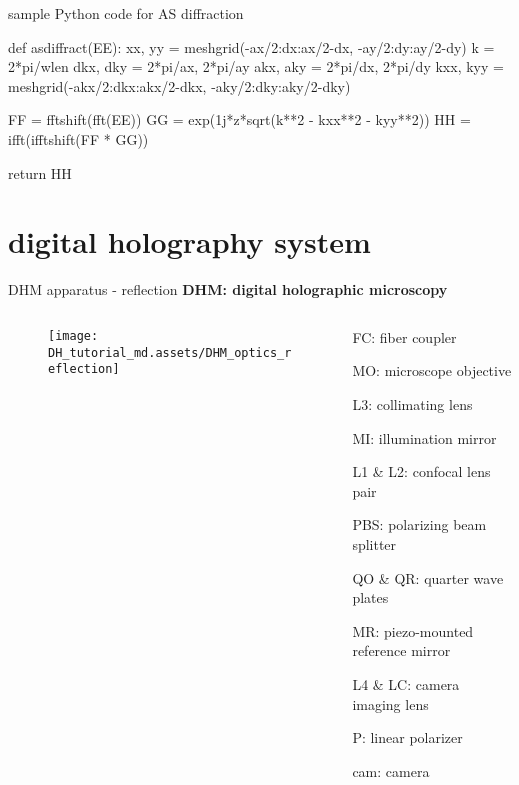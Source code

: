\documentclass[t, aspectratio=169]{beamer}
\begin{document}
\begin{frame}[fragile]{sample Python code for AS diffraction}
	\begin{semiverbatim}
def asdiffract(EE):    
    xx, yy = meshgrid(-ax/2:dx:ax/2-dx, -ay/2:dy:ay/2-dy)
    k = 2*pi/wlen
    dkx, dky = 2*pi/ax, 2*pi/ay
    akx, aky = 2*pi/dx, 2*pi/dy
    kxx, kyy = meshgrid(-akx/2:dkx:akx/2-dkx, -aky/2:dky:aky/2-dky)
    
    FF = fftshift(fft(EE))    
    GG = exp(1j*z*sqrt(k**2 - kxx**2 - kyy**2))    
    HH = ifft(ifftshift(FF * GG))
    
    return HH    
	\end{semiverbatim}
\end{frame}


\section{digital holography system}
\begin{frame}[c]
	\centering\LARGE\textbf{\secname}
\end{frame}

\begin{frame}{DHM apparatus - reflection}
	\textbf{DHM: digital holographic microscopy}
	\begin{columns}
		\begin{column}{0.65\textwidth}
			\vspace{-5 mm}
			\begin{figure}
				\texttt{[image: DH\_tutorial\_md.assets/DHM\_optics\_reflection]}
			\end{figure}
		\end{column}
		\begin{column}{0.35\textwidth}
			\vspace{-5 mm}
			\begin{itemize}
			\end{itemize}
		\end{column}
	\end{columns}
\end{frame}
\end{document}

